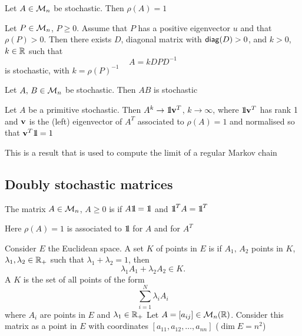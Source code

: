 \documentclass[aspectratio=169]{beamer}
\begin{document}
\begin{frame}
\begin{theorem}
Let $A\in\mathcal{M}_n$ be stochastic. Then $\rho(A)=1$
\end{theorem}
\vfill
\begin{theorem}
Let $P\in\mathcal{M}_n$, $P\geq 0$. Assume that $P$ has a positive eigenvector $u$ and that $\rho(P)>0$. Then there exists $D$, diagonal matrix with $\mathsf{diag}(D)>0$, and $k>0$, $k\in \mathbb{R}$ such that 
\[
A=kDPD^{-1}
\]
is stochastic, with $k=\rho(P)^{-1}$
\end{theorem}
\end{frame}



\begin{frame}
\begin{theorem}
Let $A,\, B\in \mathcal{M}_n$ be stochastic. Then $AB$ is stochastic
\end{theorem}
\vfill
\begin{theorem}
Let $A$ be a primitive stochastic. Then $A^{k}\to \nbOne \bv^T$, $k \to \infty$, where $\nbOne \bv^T$ has rank 1 and $\mathbf{v}$ is the (left) eigenvector of $A^T$ associated to $\rho(A)=1$ and normalised so that $\bv^T \nbOne=1$
\end{theorem}
\vfill
\begin{remark}
This is a result that is used to compute the limit of a regular Markov chain
\end{remark}
\end{frame}


\subsection{Doubly stochastic matrices}\label{sec:doublyStochastic_matrices}

\begin{frame}
\begin{definition}
The matrix $A\in \mathcal{M}_n$, $A\geq 0$ is  if $A\nbOne =\nbOne$ and $\nbOne^T A= \nbOne^T$
\end{definition}
\vfill
\begin{remark}
Here $\rho(A)=1$ is associated to $\nbOne$ for $A$ and for $A^T$
\end{remark}
\end{frame}


\begin{frame}
Consider $E$ the Euclidean space. A set $K$ of points in $E$ is  if $A_1, \, A_2$ points in $K$, $\lambda_1, \lambda_2\in \mathbb{R}_+$ such that $\lambda_1+\lambda_2=1$, then 
\[\lambda_1 A_1+ \lambda_2 A_2\in K.\]
A  $K$ is the set of all points of the form 
\[
  \sum\limits_{i=1}^N \lambda_i A_i
  \]
where $A_i$ are points in $E$ and $\lambda_1 \in \mathbb{R}_+$
\vfill
Let $A=[a_{ij}]\in\mathcal{M}_n(\mathbb{R})$. Consider this matrix as a point in $E$ with coordinates $[a_{11}, a_{12}, \dots, a_{nn}]$ ($\dim E= n^2$)
\end{frame}
\end{document}
